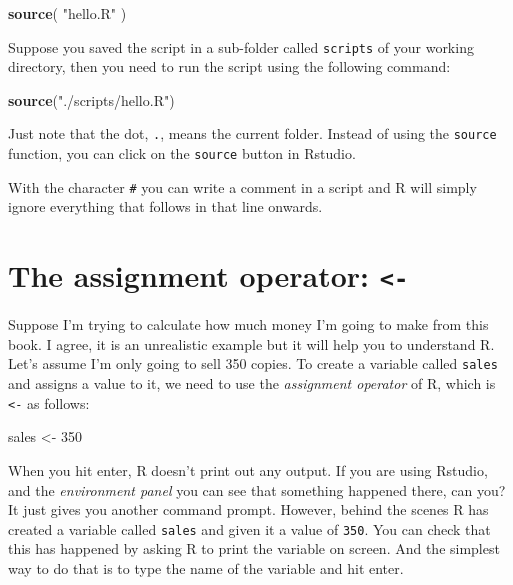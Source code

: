 \documentclass[
  12pt,
  oneside]{book}
\newenvironment{Shaded}{\begin{snugshade}}{\end{snugshade}}
\newcommand{\DecValTok}[1]{\textcolor[rgb]{0.00,0.00,0.81}{#1}}
\newcommand{\FunctionTok}[1]{\textcolor[rgb]{0.13,0.29,0.53}{\textbf{#1}}}
\newcommand{\NormalTok}[1]{#1}
\newcommand{\OtherTok}[1]{\textcolor[rgb]{0.56,0.35,0.01}{#1}}
\newcommand{\StringTok}[1]{\textcolor[rgb]{0.31,0.60,0.02}{#1}}
\theoremstyle{definition}
\theoremstyle{definition}
\theoremstyle{definition}
\theoremstyle{definition}
\theoremstyle{remark}
\begin{document}
\begin{Shaded}
\begin{Highlighting}[]
\FunctionTok{source}\NormalTok{( }\StringTok{"hello.R"}\NormalTok{ )}
\end{Highlighting}
\end{Shaded}

Suppose you saved the script in a sub-folder called \texttt{scripts} of your working directory, then you need to run the script using the following command:

\begin{Shaded}
\begin{Highlighting}[]
\FunctionTok{source}\NormalTok{(}\StringTok{"./scripts/hello.R"}\NormalTok{) }
\end{Highlighting}
\end{Shaded}

Just note that the dot, \texttt{.}, means the current folder.
Instead of using the \texttt{source} function, you can click on the \texttt{source} button in Rstudio.

With the character \texttt{\#} you can write a comment in a script and R will simply ignore everything that follows in that line onwards.

\hypertarget{sec:assignmentoper}{%
\section{\texorpdfstring{The assignment operator: \texttt{\textless{}-}}{The assignment operator: \textless-}}\label{sec:assignmentoper}}

Suppose I'm trying to calculate how much money I'm going to make from this book. I agree, it is an unrealistic example but it will help you to understand R.
Let's assume I'm only going to sell 350 copies. To create a variable called \texttt{sales} and assigns a value to it, we need to use the \emph{assignment operator} of R, which is \texttt{\textless{}-} as follows:

\begin{Shaded}
\begin{Highlighting}[]
\NormalTok{sales }\OtherTok{\textless{}{-}} \DecValTok{350}
\end{Highlighting}
\end{Shaded}

When you hit enter, R doesn't print out any output. If you are using Rstudio, and the \emph{environment panel} you can see that something happened there, can you? It just gives you another command prompt. However, behind the scenes R has created a variable called \texttt{sales} and given it a value of \texttt{350}. You can check that this has happened by asking R to print the variable on screen. And the simplest way to do that is to type the name of the variable and hit enter.
\end{document}
